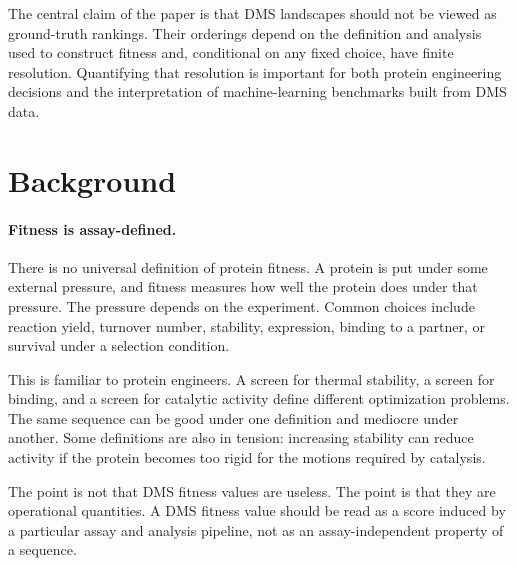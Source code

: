 \documentclass[11pt]{article}
\begin{document}
\begin{callout}
The central claim of the paper is that DMS landscapes should not be viewed as ground-truth rankings. Their orderings depend on the definition and analysis used to construct fitness and, conditional on any fixed choice, have finite resolution. Quantifying that resolution is important for both protein engineering decisions and the interpretation of machine-learning benchmarks built from DMS data.
\end{callout}

\newpage

\section*{Background}

\paragraph{Fitness is assay-defined.}
There is no universal definition of protein fitness. A protein is put under some external pressure, and fitness measures how well the protein does under that pressure. The pressure depends on the experiment. Common choices include reaction yield, turnover number, stability, expression, binding to a partner, or survival under a selection condition.

This is familiar to protein engineers. A screen for thermal stability, a screen for binding, and a screen for catalytic activity define different optimization problems. The same sequence can be good under one definition and mediocre under another. Some definitions are also in tension: increasing stability can reduce activity if the protein becomes too rigid for the motions required by catalysis.

The point is not that DMS fitness values are useless. The point is that they are operational quantities. A DMS fitness value should be read as a score induced by a particular assay and analysis pipeline, not as an assay-independent property of a sequence.
\end{document}
